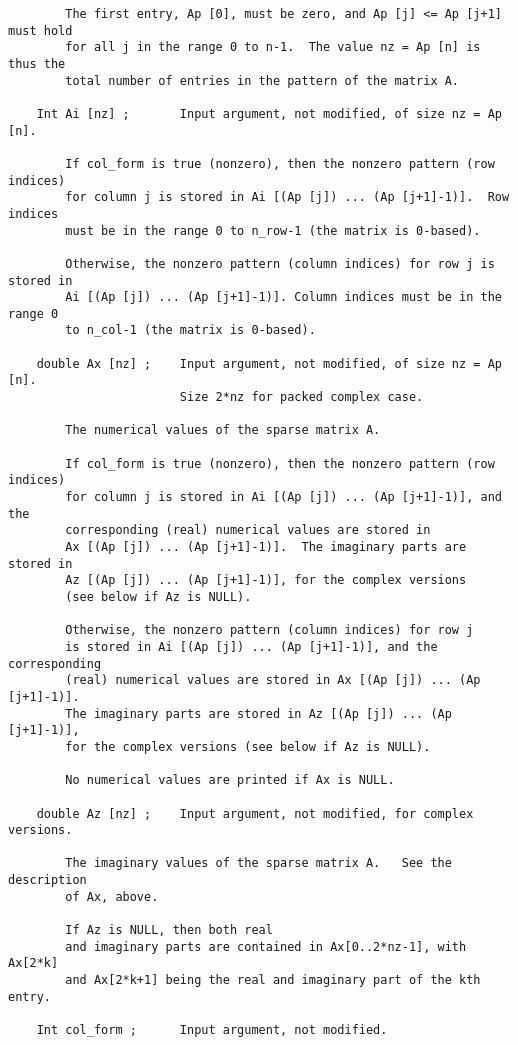 \documentclass[11pt]{article}
\begin{document}
{\begin{verbatim}
        The first entry, Ap [0], must be zero, and Ap [j] <= Ap [j+1] must hold
        for all j in the range 0 to n-1.  The value nz = Ap [n] is thus the
        total number of entries in the pattern of the matrix A.

    Int Ai [nz] ;       Input argument, not modified, of size nz = Ap [n].

        If col_form is true (nonzero), then the nonzero pattern (row indices)
        for column j is stored in Ai [(Ap [j]) ... (Ap [j+1]-1)].  Row indices
        must be in the range 0 to n_row-1 (the matrix is 0-based).

        Otherwise, the nonzero pattern (column indices) for row j is stored in
        Ai [(Ap [j]) ... (Ap [j+1]-1)]. Column indices must be in the range 0
        to n_col-1 (the matrix is 0-based).

    double Ax [nz] ;    Input argument, not modified, of size nz = Ap [n].
                        Size 2*nz for packed complex case.

        The numerical values of the sparse matrix A.

        If col_form is true (nonzero), then the nonzero pattern (row indices)
        for column j is stored in Ai [(Ap [j]) ... (Ap [j+1]-1)], and the
        corresponding (real) numerical values are stored in
        Ax [(Ap [j]) ... (Ap [j+1]-1)].  The imaginary parts are stored in
        Az [(Ap [j]) ... (Ap [j+1]-1)], for the complex versions
        (see below if Az is NULL).

        Otherwise, the nonzero pattern (column indices) for row j
        is stored in Ai [(Ap [j]) ... (Ap [j+1]-1)], and the corresponding
        (real) numerical values are stored in Ax [(Ap [j]) ... (Ap [j+1]-1)].
        The imaginary parts are stored in Az [(Ap [j]) ... (Ap [j+1]-1)],
        for the complex versions (see below if Az is NULL).

        No numerical values are printed if Ax is NULL.

    double Az [nz] ;    Input argument, not modified, for complex versions.

        The imaginary values of the sparse matrix A.   See the description
        of Ax, above.

        If Az is NULL, then both real
        and imaginary parts are contained in Ax[0..2*nz-1], with Ax[2*k]
        and Ax[2*k+1] being the real and imaginary part of the kth entry.

    Int col_form ;      Input argument, not modified.


\end{verbatim}}
\end{document}
